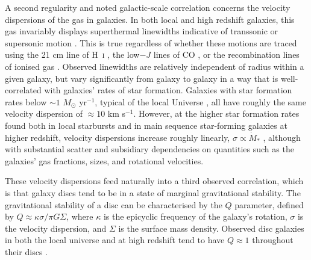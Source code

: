 \documentclass[useAMS,usenatbib]{mn2e}
\begin{document}
A second regularity and noted galactic-scale correlation concerns the velocity dispersions of the gas in galaxies. In both local and high redshift galaxies, this gas invariably displays superthermal linewidths indicative of transsonic or supersonic motion \citep[and references therein]{glazebrook13a}. This is true regardless of whether these motions are traced using the 21 cm line of H~\textsc{i} \citep{van-zee99a, petric07a, tamburro09a, burkhart10a, ianjamasimanana12a, ianjamasimanana15a, stilp13a, chepurnov15a}, the low$-J$ lines of CO \citep{caldu-primo13a, caldu-primo15a, meidt13a, pety13a}, or the recombination lines of ionised gas \citep{cresci09a, lehnert09a, lehnert13a, green10a, green14a, le-tiran11a, swinbank12a, arribas14a, genzel14a, moiseev15a}. Observed linewidths are relatively independent of radius within a given galaxy, but vary significantly from galaxy to galaxy in a way that is well-correlated with galaxies' rates of star formation. Galaxies with star formation rates below $\sim 1$ $M_\odot$ yr$^{-1}$, typical of the local Universe \citep{kennicutt12a}, all have roughly the same velocity dispersion of $\approx 10$ km s$^{-1}$. However, at the higher star formation rates found both in local starbursts and in main sequence star-forming galaxies at higher redshift, velocity dispersions increase roughly linearly, $\sigma \propto \dot{M}_*$ \citep{krumholz16a}, although with substantial scatter and subsidiary dependencies on quantities such as the galaxies' gas fractions, sizes, and rotational velocities.

These velocity dispersions feed naturally into a third observed correlation, which is that galaxy discs tend to be in a state of marginal gravitational stability. The gravitational stability of a disc can be characterised by the \citet{toomre64a} $Q$ parameter, defined by $Q \approx \kappa\sigma/\pi G \Sigma$, where $\kappa$ is the epicyclic frequency of the galaxy's rotation, $\sigma$ is the velocity dispersion, and $\Sigma$ is the surface mass density. Observed disc galaxies in both the local universe and at high redshift tend to have $Q\approx 1$ throughout their discs \citep[e.g.,][]{martin02a, genzel10a, meurer13a, romeo13a, romeo17a}.
\end{document}
